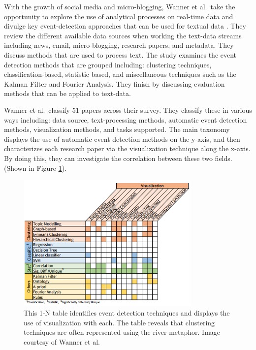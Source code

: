 With the growth of social media and micro-blogging, Wanner et al.\ take the opportunity to explore the use of analytical processes on real-time data and divulge key event-detection approaches that can be used for textual data \cite{wanner2014state}.
They review the different available data sources when working the text-data streams including news, email, micro-blogging, research papers, and metadata. They discuss methods that are used to process text. The study examines the event detection methods that are grouped including: clustering techniques, classification-based, statistic based, and miscellaneous techniques such as the Kalman Filter and Fourier Analysis. They finish  by discussing evaluation methods that can be applied to text-data. 

Wanner et al.\ classify 51 papers across their survey. They classify these in various ways including: data source, text-processing methods, automatic event detection methods, visualization methods, and tasks supported. The main taxonomy displays the use of automatic event detection methods on the y-axis, and then characterizes each research paper via the visualization technique along the x-axis. By doing this, they can investigate the correlation between these two fields. (Shown in Figure \ref{fig: wanner2014state}).

\begin{figure}[t]
\begin{center}
\includegraphics[width=0.8\textwidth]{images/wanner2014state.png}
\caption{This 1-N table identifies event detection techniques and displays the use of visualization with each. The table reveals that clustering techniques are  often represented using the river metaphor. Image courtesy of Wanner et al.\ \cite{wanner2014state}} \label{fig: wanner2014state}
\end{center}
\end{figure}

